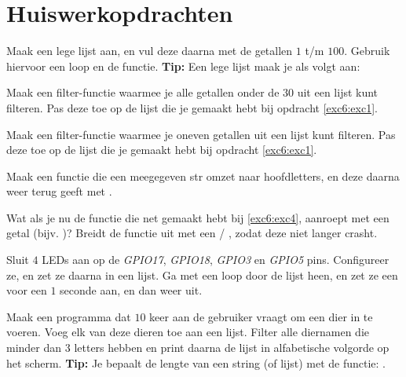 \newpage

\section{Huiswerkopdrachten}

\begin{exercise}\label{exc6:exc1}
Maak een lege lijst aan, en vul deze daarna met de getallen $1$ t/m $100$.
Gebruik hiervoor een loop en de  functie. \newline
\textbf{Tip:} Een lege lijst maak je als volgt aan: 
\end{exercise}

\begin{exercise}
Maak een filter-functie waarmee je alle getallen onder de $30$ uit een lijst kunt filteren. Pas deze toe op de lijst die je gemaakt hebt bij opdracht \ref{exc6:exc1}.
\end{exercise}

\begin{exercise}
Maak een filter-functie waarmee je oneven getallen uit een lijst kunt filteren. Pas deze toe op de lijst die je gemaakt hebt bij opdracht \ref{exc6:exc1}.
\end{exercise}

\begin{exercise}
\label{exc6:exc4}
Maak een functie  die een meegegeven str omzet naar hoofdletters, en deze daarna weer terug geeft met . 
\end{exercise}

\begin{exercise}
Wat als je nu de functie die net gemaakt hebt bij \ref{exc6:exc4}, aanroept met een getal (bijv. )? \newline
Breidt de functie uit met een  / , zodat deze niet langer crasht. 
\end{exercise}

\begin{exercise}
Sluit $4$ LEDs aan op de \textit{GPIO17}, \textit{GPIO18}, \textit{GPIO3} en \textit{GPIO5} pins. Configureer ze, en zet ze daarna in een lijst. Ga met een loop door de lijst heen, en zet ze een voor een $1$ seconde aan, en dan weer uit.
\end{exercise}

\begin{exercise}
Maak een programma dat $10$ keer aan de gebruiker vraagt om een dier in te voeren. Voeg elk van deze dieren toe aan een lijst. Filter alle diernamen die minder dan $3$ letters hebben en print daarna de lijst in alfabetische volgorde op het scherm. \newline
\textbf{Tip:} Je bepaalt de lengte van een string (of lijst) met de functie: .
\end{exercise}
